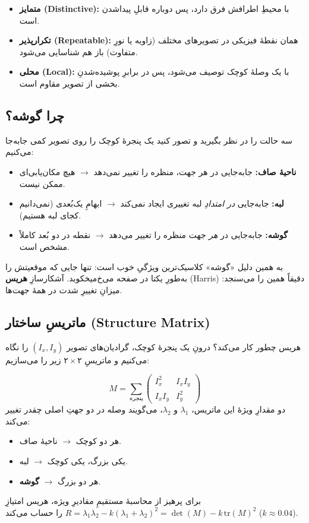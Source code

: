 \documentclass[12pt]{article}
\begin{document}
\begin{itemize}
  \item \textbf{متمایز (Distinctive):} با محیطِ اطرافش فرق دارد، پس دوباره قابلِ پیدا‌شدن است.
  \item \textbf{تکرارپذیر (Repeatable):} همان نقطهٔ فیزیکی در تصویرهای مختلف (زاویه یا نورِ متفاوت) باز هم شناسایی می‌شود.
  \item \textbf{محلی (Local):} با یک وصلهٔ کوچک توصیف می‌شود، پس در برابرِ پوشیده‌شدنِ بخشی از تصویر مقاوم است.
\end{itemize}

\subsection{چرا گوشه؟}

سه حالت را در نظر بگیرید و تصور کنید یک پنجرهٔ کوچک را روی تصویر کمی جابه‌جا می‌کنیم:

\begin{itemize}
  \item \textbf{ناحیهٔ صاف:} جابه‌جایی در هر جهت، منظره را تغییر نمی‌دهد $\rightarrow$ هیچ مکان‌یابی‌ای ممکن نیست.
  \item \textbf{لبه:} جابه‌جایی \emph{در امتدادِ} لبه تغییری ایجاد نمی‌کند $\rightarrow$ ابهامِ یک‌بُعدی (نمی‌دانیم کجای لبه هستیم).
  \item \textbf{گوشه:} جابه‌جایی در \emph{هر} جهت منظره را تغییر می‌دهد $\rightarrow$ نقطه در دو بُعد کاملاً مشخص است.
\end{itemize}

\begin{nokte}
به همین دلیل «گوشه» کلاسیک‌ترین ویژگیِ خوب است: تنها جایی که موقعیتش را به‌طورِ یکتا در صفحه می‌خ‌میخکوبد. آشکارسازِ \textbf{هریس} (Harris) دقیقاً همین را می‌سنجد: میزانِ تغییرِ شدت در همهٔ جهت‌ها.
\end{nokte}

\subsection{ماتریسِ ساختار (Structure Matrix)}

هریس چطور کار می‌کند؟ درونِ یک پنجرهٔ کوچک، گرادیان‌های تصویر $(I_x, I_y)$ را نگاه می‌کنیم و ماتریسِ $۲\times۲$ زیر را می‌سازیم:

\begin{riyazi}
\[
M = \sum_{\text{پنجره}} \begin{pmatrix} I_x^2 & I_x I_y \\ I_x I_y & I_y^2 \end{pmatrix}
\]
دو مقدارِ ویژهٔ این ماتریس، $\lambda_1$ و $\lambda_2$، می‌گویند وصله در دو جهتِ اصلی چقدر تغییر می‌کند:
\begin{itemize}
  \item هر دو کوچک $\rightarrow$ ناحیهٔ صاف.
  \item یکی بزرگ، یکی کوچک $\rightarrow$ لبه.
  \item هر دو بزرگ $\rightarrow$ \textbf{گوشه}.
\end{itemize}
برای پرهیز از محاسبهٔ مستقیمِ مقادیرِ ویژه، هریس امتیازِ $R=\lambda_1\lambda_2 - k(\lambda_1+\lambda_2)^2 = \det(M) - k\,\mathrm{tr}(M)^2$ را حساب می‌کند ($k\approx0.04$).
\end{riyazi}
\end{document}
